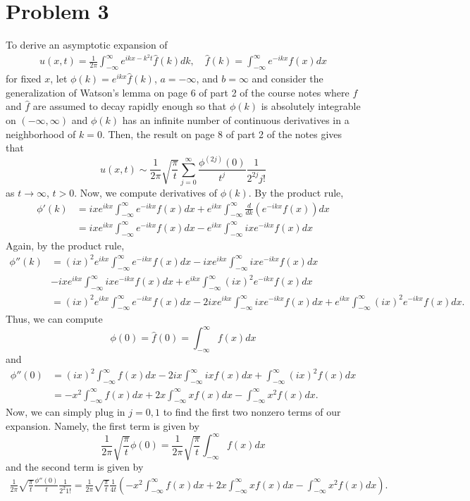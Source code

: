 \documentclass{article}
\begin{document}
\section{Problem 3}
To derive an asymptotic expansion of \begin{align*}
	u(x,t) = \frac{1}{2 \pi} \int_{-\infty}^\infty e^{i k x - k^2 t} \hat f(k) d k, \quad \hat f(k) = \int_{-\infty}^\infty e^{-i k x} f(x) d x
\end{align*}
for fixed $x$, let $\phi(k)=e^{ikx}\hat{f}(k)$, $a=-\infty$, and $b=\infty$ and consider the generalization of Watson's lemma on page 6 of part 2 of the course notes where $f$ and $\hat f$ are assumed to decay rapidly enough so that $\phi(k)$ is absolutely integrable on $(-\infty,\infty)$ and $\phi(k)$ has an infinite number of continuous derivatives in a neighborhood of $k=0$. Then, the result on page 8 of part 2 of the notes gives that 
\[
u(x,t)\sim\frac{1}{2\pi}\sqrt{\frac{\pi}{t}}\sum_{j=0}^\infty\frac{\phi^{(2j)}(0)}{t^j}\frac{1}{2^{2j}j!}
\]
as $t\to\infty$, $t>0$. Now, we compute derivatives of $\phi(k)$. By the product rule, 
\begin{align*}
\phi'(k)&=ixe^{ikx}\int_{-\infty}^\infty e^{-ikx}f(x)dx+e^{ikx}\int_{-\infty}^\infty \frac{d}{dk}(e^{-ikx}f(x))dx\\&=
ixe^{ikx}\int_{-\infty}^\infty e^{-ikx}f(x)dx-e^{ikx}\int_{-\infty}^\infty ixe^{-ikx}f(x)dx
\end{align*}
Again, by the product rule,
\begin{align*}
\phi''(k)&=(ix)^2e^{ikx}\int_{-\infty}^\infty e^{-ikx}f(x)dx-ixe^{ikx}\int_{-\infty}^\infty ix e^{-ikx}f(x)dx\\&-ixe^{ikx}\int_{-\infty}^\infty ix e^{-ikx}f(x)dx+e^{ikx}\int_{-\infty}^\infty (ix)^2e^{-ikx}f(x)dx\\&=
(ix)^2e^{ikx}\int_{-\infty}^\infty e^{-ikx}f(x)dx-2ixe^{ikx}\int_{-\infty}^\infty ix e^{-ikx}f(x)dx+e^{ikx}\int_{-\infty}^\infty (ix)^2e^{-ikx}f(x)dx.
\end{align*}
Thus, we can compute
\[
\phi(0)=\hat{f}(0)=\int_{-\infty}^\infty f(x)dx
\]
and
\begin{align*}
\phi''(0)&=(ix)^2\int_{-\infty}^\infty f(x)dx-2ix\int_{-\infty}^\infty ix f(x)dx+\int_{-\infty}^\infty (ix)^2f(x)dx\\&=
-x^2\int_{-\infty}^\infty f(x)dx+2x\int_{-\infty}^\infty xf(x)dx-\int_{-\infty}^\infty x^2f(x)dx.
\end{align*}
Now, we can simply plug in $j=0,1$ to find the first two nonzero terms of our expansion. Namely, the first term is given by
\[
\frac{1}{2\pi}\sqrt{\frac{\pi}{t}}\phi(0)=\frac{1}{2\pi}\sqrt{\frac{\pi}{t}}\int_{-\infty}^\infty f(x)dx
\]
and the second term is given by
\begin{align*}
\frac{1}{2\pi}\sqrt{\frac{\pi}{t}}\frac{\phi''(0)}{t}\frac{1}{2^{2}1!}=
\frac{1}{2\pi}\sqrt{\frac{\pi}{t}}\frac{1}{4t}\left(-x^2\int_{-\infty}^\infty f(x)dx+2x\int_{-\infty}^\infty xf(x)dx-\int_{-\infty}^\infty x^2f(x)dx\right).
\end{align*}
	
\end{document}
